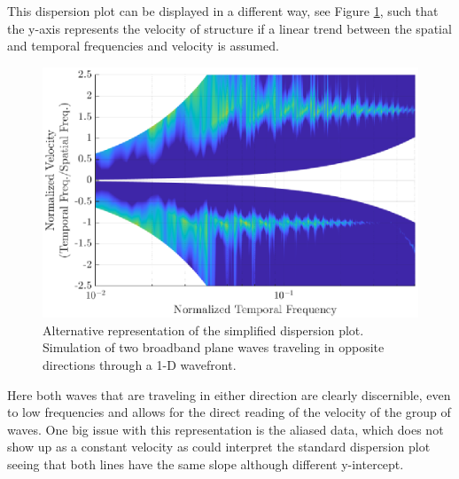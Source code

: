 This dispersion plot can be displayed in a different way, see Figure \ref{fig:04_simple_dispersion_vel}, such that the y-axis represents the velocity of structure if a linear trend between the spatial and temporal frequencies and velocity is assumed.
\begin{figure}
  \centering
  \includegraphics{../matlab/04_basic_filtering/simple_dispersion_vel.eps}
  \caption{Alternative representation of the simplified dispersion plot.  Simulation of two broadband plane waves traveling in opposite directions through a 1-D wavefront.}
  \label{fig:04_simple_dispersion_vel}
\end{figure}
Here both waves that are traveling in either direction are clearly discernible, even to low frequencies and allows for the direct reading of the velocity of the group of waves.
One big issue with this representation is the aliased data, which does not show up as a constant velocity as could interpret the standard dispersion plot seeing that both lines have the same slope although different y-intercept.

